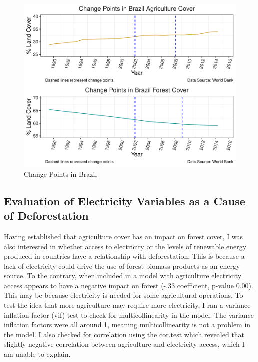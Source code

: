 \documentclass[12pt,]{article}
\begin{document}
\begin{figure}
\centering
\includegraphics{Marx_ENV872_Project_files/figure-latex/unnamed-chunk-9-1.pdf}
\caption{\label{fig:fig5}Change Points in Brazil}
\end{figure}

\subsection{Evaluation of Electricity Variables as a Cause of
Deforestation}\label{evaluation-of-electricity-variables-as-a-cause-of-deforestation}

Having established that agriculture cover has an impact on forest cover,
I was also interested in whether access to electricity or the levels of
renewable energy produced in countries have a relationship with
deforestation. This is because a lack of electricity could drive the use
of forest biomass products as an energy source. To the contrary, when
included in a model with agriculture electricity access appears to have
a negative impact on forest (-.33 coefficient, p-value 0.00). This may
be because electricity is needed for some agricultural operations. To
test the idea that more agriculture may require more electricity, I ran
a variance inflation factor (vif) test to check for multicollinearity in
the model. The variance inflation factors were all around 1, meaning
multicollinearity is not a problem in the model. I also checked for
correlation using the cor.test which revealed that slightly negative
correlation between agriculture and electricity access, which I am
unable to explain.
\end{document}
